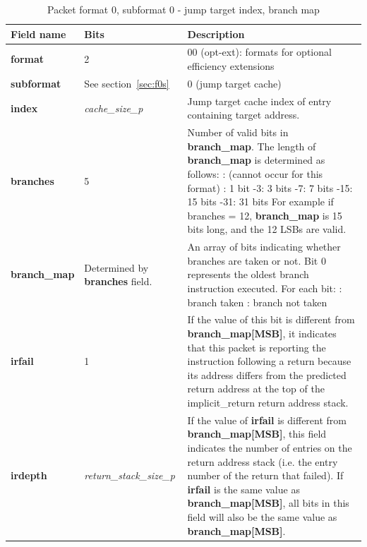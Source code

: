 \begin{table}[htp]
  \centering
  \caption{Packet format 0, subformat 0 - jump target index, branch map}
  \label{tab:te_inst0-0-cache-map}
  \begin{tabulary}{\textwidth}{|l|p{35mm}|p{90mm}|}
    \hline
    {\bf Field name} & {\bf Bits} & {\bf Description} \\
    \hline
    \textbf{format}	& 2	& 00 (opt-ext): formats for optional efficiency extensions\\
    \hline
     \textbf{subformat}  & See section~\ref{sec:f0s} & 0 (jump target cache)\\
     \hline
    \textbf{index} & \textit {\textit{cache\_size\_p}} & 
              Jump target cache index of entry containing target address.\\ 
    \hline
    \textbf{branches} & 5 & Number of valid bits in \textbf{branch\_map}. The length of \textbf{branch\_map} is determined as follows: :	   (cannot occur for this format) :	   1 bit -3:   3 bits -7:   7 bits -15:  15 bits -31: 31 bits \newline
    For example if branches = 12, \textbf{branch\_map} is 15 bits long, and the 12 LSBs are valid. \\
    \hline
    \textbf{branch\_map} & Determined by \newline 
                 \textbf{branches} field. & 
                 An array of bits indicating whether branches are taken or not.\newline
    Bit 0 represents the oldest branch instruction executed.   For each bit: : branch taken : branch not taken \\
    \hline
    \textbf{irfail}	& 1 & 
                If the value of this bit is different from \textbf{branch\_map[MSB]}, it indicates that this
                packet is reporting the instruction following a return because its address differs from 
                the predicted return address at the top of the implicit\_return return address stack.\\
    \hline
    \textbf{irdepth}	& \textit {return\_stack\_size\_p} & 
                If the value of \textbf{irfail} is different from \textbf{branch\_map[MSB]}, this field indicates 
                the number of entries on the return address stack (i.e. the entry number of the return that
                failed).  If \textbf{irfail} is the same value as \textbf{branch\_map[MSB]}, all bits in this field 
                will also be the same value as \textbf{branch\_map[MSB]}. \\
    \hline
  \end{tabulary}
\end{table}

